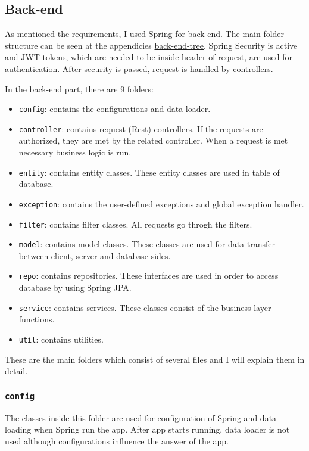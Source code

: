 \subsection{Back-end}

As mentioned the requirements, I used Spring for back-end. The main folder structure can be seen at the appendicies \hyperref[back-end-tree]{back-end-tree}. Spring Security is active and JWT tokens, which are needed to be inside header of request, are used for authentication. After security is passed, request is handled by controllers.

In the back-end part, there are 9 folders:
\begin{itemize}
  \item \texttt{config}: contains the configurations and data loader.
  \item \texttt{controller}: contains request (Rest) controllers. If the requests are authorized, they are met by the related controller. When a request is met necessary business logic is run.
  \item \texttt{entity}: contains entity classes. These entity classes are used in table of database.
  \item \texttt{exception}: contains the user-defined exceptions and global exception handler.
  \item \texttt{filter}: contains filter classes. All requests go throgh the filters.
  \item \texttt{model}: contains model classes. These classes are used for data transfer between client, server and database sides.
  \item \texttt{repo}: contains repositories. These interfaces are used in order to access database by using Spring JPA.
  \item \texttt{service}: contains services. These classes consist of the business layer functions.
  \item \texttt{util}: contains utilities.
\end{itemize}
These are the main folders which consist of several files and I will explain them in detail.


\subsubsection{\texttt{config}}

The classes inside this folder are used for configuration of Spring and data loading when Spring run the app. After app starts running, data loader is not used although configurations influence the answer of the app.

